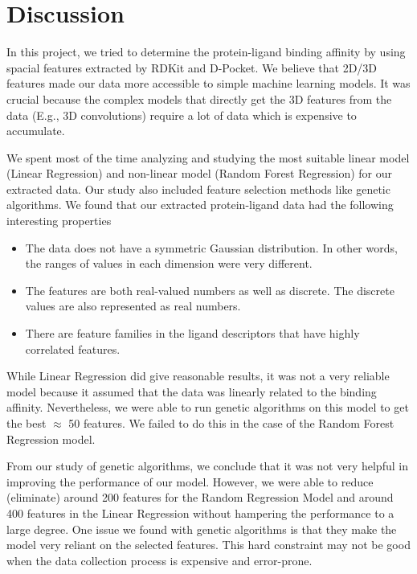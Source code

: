 \documentclass[11pt]{article}
\begin{document}
\section{Discussion}
In this project, we tried to determine the protein-ligand binding affinity by using spacial features extracted by RDKit and D-Pocket.
We believe that 2D/3D features made our data more accessible to simple machine learning models. 
It was crucial because the complex models that directly get the 3D features from the data (E.g., 3D convolutions) require a lot of data which is expensive to accumulate.

We spent most of the time analyzing and studying the most suitable linear model (Linear Regression) and non-linear model (Random Forest Regression) for our extracted data.
Our study also included feature selection methods like genetic algorithms.
We found that our extracted protein-ligand data had the following interesting properties
\begin{itemize}
\item The data does not have a symmetric Gaussian distribution.  In other words, the ranges of values in each dimension were very different.
\item The features are both real-valued numbers as well as discrete.  The discrete values are also represented as real numbers.
\item There are feature families in the ligand descriptors that have highly correlated features.
\end{itemize}

While Linear Regression did give reasonable results,  it was not a very reliable model because it assumed that the data was linearly related to the binding affinity.
Nevertheless,  we were able to run genetic algorithms on this model to get the best $\approx$ 50 features.
We failed to do this in the case of the Random Forest Regression model.

From our study of genetic algorithms, we conclude that it was not very helpful in improving the performance of our model. However, we were able to reduce (eliminate) around 200 features for the Random Regression Model and around 400 features in the Linear Regression without hampering the performance to a large degree.
One issue we found with genetic algorithms is that they make the model very reliant on the selected features.
This hard constraint may not be good when the data collection process is expensive and error-prone.
\end{document}
